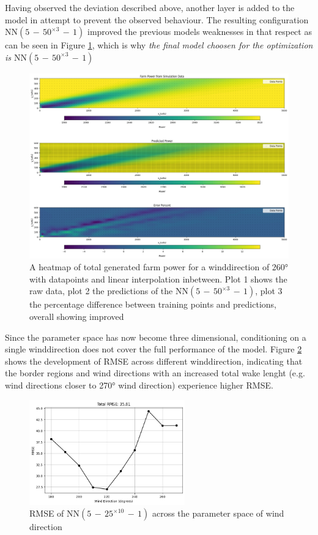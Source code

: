 Having observed the deviation described above, another layer is added to the model in attempt to prevent the observed behaviour. The resulting configuration $\text{NN}(5\,{-}\,50^{\times3}\,{-}\,1)$ improved the previous models weaknesses in that respect as can be seen in Figure \ref{fig:prob_model_colormap_2}, which is why \textit{the final model choosen for the optimization is  $\text{NN}(5\,{-}\,50^{\times3}\,{-}\,1)$}

\begin{figure}[h] 
	\centering
	\includegraphics[width=1\textwidth]{figures/optimization/prob_model_colormap_2.png} 
	\caption{A heatmap of total generated farm power for a winddirection of 260° with datapoints and linear interpolation inbetween. Plot 1 shows the raw data, plot 2 the predictions of the $\text{NN}(5\,{-}\,50^{\times3}\,{-}\,1)$, plot 3 the percentage difference between training points and predictions, overall showing improved }
	\label{fig:prob_model_colormap_2}
\end{figure}

Since the parameter space has now become three dimensional, conditioning on a single winddirection does not cover the full performance of the model. Figure \ref{fig:rmse_dist_3layers50nodes} shows the development of RMSE across different winddirection, indicating that the border regions and wind directions with an increased total wake lenght (e.g. wind directions closer to 270° wind direction) experience higher RMSE. 

\begin{figure}[h] 
	\centering
	\includegraphics[width=0.6\textwidth]{figures/optimization/rmse_dist_3layers50nodes.png}
	\caption{RMSE of  $\text{NN}(5\,{-}\,25^{\times10}\,{-}\,1)$ across the parameter space of wind direction }
	\label{fig:rmse_dist_3layers50nodes}
\end{figure}



